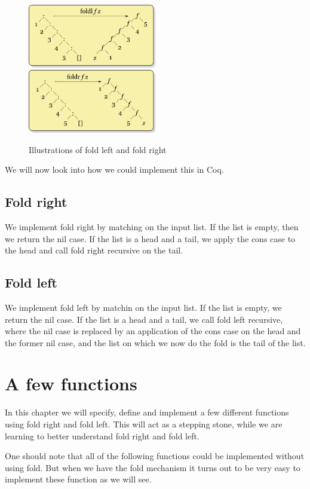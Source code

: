 \documentclass[a4paper]{article}
\begin{document}
\begin{figure}[h]
\includegraphics[width=0.5\textwidth]{fold_left}
\includegraphics[width=0.5\textwidth]{fold_right}
\caption{Illustrations of fold left and fold right}
\label{fig:folds}
\end{figure}

We will now look into how we could implement this in Coq.

\subsection{Fold right}
We implement fold right by matching on the input list. If the list is empty,
then we return the nil case. If the list is a head and a tail, we apply the cons case
to the head and call fold right recursive on the tail.

\subsection{Fold left}
We implement fold left by matchin on the input list. If the list is empty, we
return the nil case. If the list is a head and a tail, we call fold left recursive,
where the nil case is replaced by an application of the cons case on the head and
the former nil case, and the list on which we now do the fold is the tail of the list.

\section{A few functions}
In this chapter we will specify, define and implement a few different
functions using fold right and fold left. This will act as a stepping
stone, while we are learning to better understand fold right and fold
left.

One should note that all of the following functions could be implemented
without using fold. But when we have the fold mechanism it turns out to be very
easy to implement these function as we will see.
\end{document}
